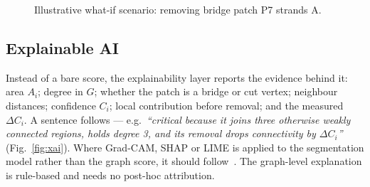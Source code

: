 \documentclass[conference]{IEEEtran}
\begin{document}
\begin{figure}[!tbp]
\centering
{}
\caption{Illustrative what-if scenario: removing bridge patch P7 strands A.}
\label{fig:whatif}
\end{figure}

\subsection{Explainable AI}

Instead of a bare score, the explainability layer reports the evidence behind it: area $A_i$; degree in $G$; whether the patch is a bridge or cut vertex; neighbour distances; confidence $C_i$; local contribution before removal; and the measured $\Delta C_i$. A sentence follows --- e.g.\ \emph{``critical because it joins three otherwise weakly connected regions, holds degree 3, and its removal drops connectivity by $\Delta C_i$''} (Fig.~\ref{fig:xai}). Where Grad-CAM, SHAP or LIME is applied to the segmentation model rather than the graph score, it should follow~\cite{klotz2025xai,naceur2025unet}. The graph-level explanation is rule-based and needs no post-hoc attribution.
\end{document}
